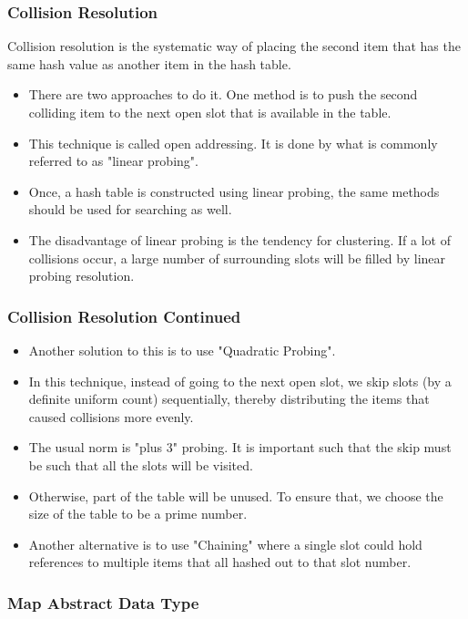 \documentclass{beamer}
\begin{document}
\begin{frame}
\frametitle{Collision Resolution}
Collision resolution is the systematic  way of placing the second item that has the same hash value as another item in the hash table. 
\begin{itemize}
\item There are two approaches to do it. One method is to push the second colliding item to the next open slot that is available in the table.
\item This technique is called open addressing. It is done by what is commonly referred to as "linear probing".
\item Once, a hash table is constructed using linear probing, the same methods should be used for searching as well.
\item The disadvantage of linear probing is the tendency for clustering. If a lot of collisions occur, a large number of surrounding slots will be filled by linear probing resolution.
\end{itemize}
\end{frame}

\begin{frame}
\frametitle{Collision Resolution Continued}
\begin{itemize}
\item Another solution to this is to use "Quadratic Probing".
\item In this technique, instead of going to the next open slot, we skip slots (by a definite uniform count) sequentially, thereby distributing the items that caused collisions more evenly.
\item The usual norm is "plus 3" probing. It is important such that the skip must be such that all the slots will be visited.
\item Otherwise, part of the table will be unused. To ensure that, we choose the size of the table to be a prime number.
\item Another alternative is to use "Chaining" where a single slot could hold references to multiple items that all hashed out to that slot number.
\end{itemize}
\end{frame}

\begin{frame}
\frametitle{Map Abstract Data Type}
\end{frame}
\end{document}
